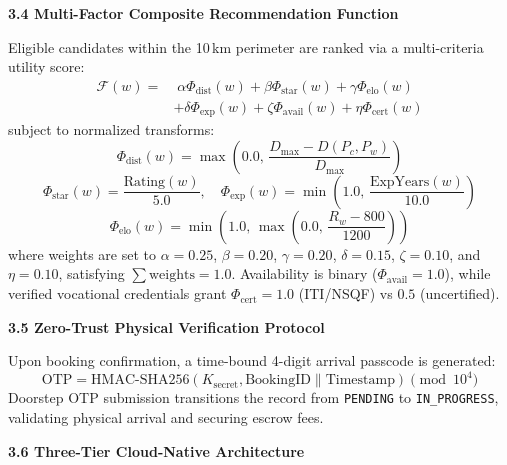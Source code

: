 \documentclass[10pt,twocolumn,a4paper]{article}
\begin{document}
\vspace{0.25em}
\noindent
\textbf{3.4 Multi-Factor Composite Recommendation Function}

Eligible candidates within the 10\,km perimeter are ranked via a multi-criteria utility score:
\begin{equation}
\begin{aligned}
\mathcal{F}(w) = &\; \alpha \Phi_{\text{dist}}(w) + \beta \Phi_{\text{star}}(w) + \gamma \Phi_{\text{elo}}(w) \\
& + \delta \Phi_{\text{exp}}(w) + \zeta \Phi_{\text{avail}}(w) + \eta \Phi_{\text{cert}}(w)
\end{aligned}
\end{equation}
subject to normalized transforms:
\begin{equation}
\Phi_{\text{dist}}(w) = \max\left(0.0, \, \frac{D_{\max} - D(P_c, P_w)}{D_{\max}}\right)
\end{equation}
\begin{equation}
\Phi_{\text{star}}(w) = \frac{\text{Rating}(w)}{5.0}, \quad \Phi_{\text{exp}}(w) = \min\left(1.0, \, \frac{\text{ExpYears}(w)}{10.0}\right)
\end{equation}
\begin{equation}
\Phi_{\text{elo}}(w) = \min\left(1.0, \, \max\left(0.0, \, \frac{R_w - 800}{1200}\right)\right)
\end{equation}
where weights are set to $\alpha = 0.25$, $\beta = 0.20$, $\gamma = 0.20$, $\delta = 0.15$, $\zeta = 0.10$, and $\eta = 0.10$, satisfying $\sum \text{weights} = 1.0$. Availability is binary ($\Phi_{\text{avail}} = 1.0$), while verified vocational credentials grant $\Phi_{\text{cert}} = 1.0$ (ITI/NSQF) vs $0.5$ (uncertified).

\vspace{0.25em}
\noindent
\textbf{3.5 Zero-Trust Physical Verification Protocol}

Upon booking confirmation, a time-bound 4-digit arrival passcode is generated:
\begin{equation}
\text{OTP} = \text{HMAC-SHA256}(K_{\text{secret}}, \text{BookingID} \parallel \text{Timestamp}) \pmod{10^4}
\end{equation}
Doorstep OTP submission transitions the record from \texttt{PENDING} to \texttt{IN\_PROGRESS}, validating physical arrival and securing escrow fees.

\vspace{0.25em}
\noindent
\textbf{3.6 Three-Tier Cloud-Native Architecture}
\end{document}
